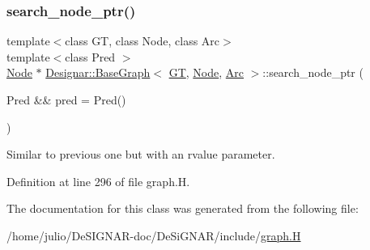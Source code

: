 \subsubsection{\texorpdfstring{search\+\_\+node\+\_\+ptr()}{search\_node\_ptr()}\hspace{0.1cm}{\footnotesize\ttfamily [2/2]}}
{\footnotesize\ttfamily template$<$class GT, class Node, class Arc$>$ \\
template$<$class Pred $>$ \\
\hyperlink{namespace_designar_a5af326c65aa2bd26b26c410f2030d09e}{Node} $\ast$ \hyperlink{class_designar_1_1_base_graph}{Designar\+::\+Base\+Graph}$<$ \hyperlink{demo-buildgraph_8_c_a3001c40d2c31ca87ed96cd7d1334a55e}{GT}, \hyperlink{namespace_designar_a5af326c65aa2bd26b26c410f2030d09e}{Node}, \hyperlink{namespace_designar_a3f55fb5513d62ff47cbc8f72b8e95d6f}{Arc} $>$\+::search\+\_\+node\+\_\+ptr (\begin{DoxyParamCaption}\item[{Pred \&\&}]{pred = {\ttfamily Pred()} }\end{DoxyParamCaption})\hspace{0.3cm}{\ttfamily [inline]}}



Similar to previous one but with an rvalue parameter. 



Definition at line 296 of file graph.\+H.



The documentation for this class was generated from the following file\+:\begin{DoxyCompactItemize}
\item 
/home/julio/\+De\+S\+I\+G\+N\+A\+R-\/doc/\+De\+Si\+G\+N\+A\+R/include/\hyperlink{graph_8_h}{graph.\+H}\end{DoxyCompactItemize}
